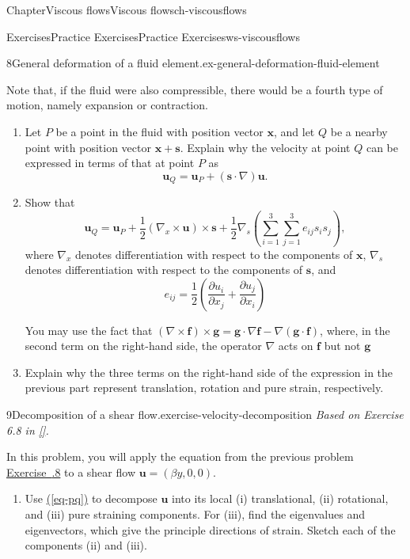 \documentclass[oneside,10pt,]{book}
\newcommand{\xreffont}{\relax}
\numberwithin{equation}{section}
\newcommand{\pd}[2]{\frac{\partial#1}{\partial#2}}
\newcommand{\bx}{\boldsymbol{x}}
\newcommand{\bs}{\boldsymbol{s}}
\newcommand{\bu}{\boldsymbol{u}}
\renewcommand{\bf}{\boldsymbol{f}}
\newcommand{\bg}{\boldsymbol{g}}
\begin{document}
\begin{chapterptx}{Chapter}{Viscous flows}{}{Viscous flows}{}{}{ch-viscousflows}
\begin{exercises-section}{Exercises}{Practice Exercises}{}{Practice Exercises}{}{}{ws-viscousflows}
\begin{divisionexercise}{8}{General deformation of a fluid element.}{}{ex-general-deformation-fluid-element}
 \par
Note that, if the fluid were also compressible, there would be a fourth type of motion, namely expansion or contraction.%
\begin{enumerate}[font=\bfseries,label=(\alph*),ref=\alph*]%
\item{}Let \(P\) be a point in the fluid with position vector \(\bx\), and let \(Q\) be a nearby point with position vector \(\bx+\bs\). Explain why the velocity at point \(Q\) can be expressed in terms of that at point \(P\) as%
\begin{equation*}
\bu_Q=\bu_P+(\bs\cdot\nabla)\bu.
\end{equation*}
%
\item{}Show that%
\begin{equation}
\bu_Q=\bu_P+\frac12(\nabla_x\times\bu)\times\bs
+\frac12\nabla_s(\sum_{i=1}^3\sum_{j=1}^3e_{ij}s_is_j),\label{eq-pq}
\end{equation}
where \(\nabla_x\) denotes differentiation with respect to the components of \(\bx\), \(\nabla_s\) denotes differentiation with respect to the components of \(\bs\), and%
\begin{equation*}
e_{ij}=\frac12\left(\pd{u_i}{x_j}+\pd{u_j}{x_i}\right)
\end{equation*}
%
\par
You may use the fact that \((\nabla\times\bf)\times\bg=\bg\cdot\nabla\bf-\nabla(\bg\cdot\bf)\), where, in the second term on the right-hand side, the operator \(\nabla\) acts on \(\bf\) but not \(\bg\)%
\item{}Explain why the three terms on the right-hand side of the expression in the previous part represent translation, rotation and pure strain, respectively.%
\end{enumerate}%
\end{divisionexercise}%
\begin{divisionexercise}{9}{Decomposition of a shear flow.}{}{exercise-velocity-decomposition}%
\emph{Based on Exercise 6.8 in \hyperlink{ref-acheson}{[{\xreffont 4}]}.}%
 \par
In this problem, you will apply the equation from the previous problem \hyperlink{ex-general-deformation-fluid-element}{Exercise~{\xreffont 6.9.8}} to a shear flow \(\bu=(\beta y,0,0)\).%
\begin{enumerate}[font=\bfseries,label=(\alph*),ref=\alph*]%
\item{}Use \hyperref[eq-pq]{({\xreffont\ref{eq-pq}})} to decompose \(\bu\) into its local (i) translational, (ii) rotational, and (iii) pure straining components. For (iii), find the eigenvalues and eigenvectors, which give the principle directions of strain. Sketch each of the components (ii) and (iii).%

\end{enumerate}
\end{divisionexercise}
\end{exercises-section}
\end{chapterptx}
\end{document}
